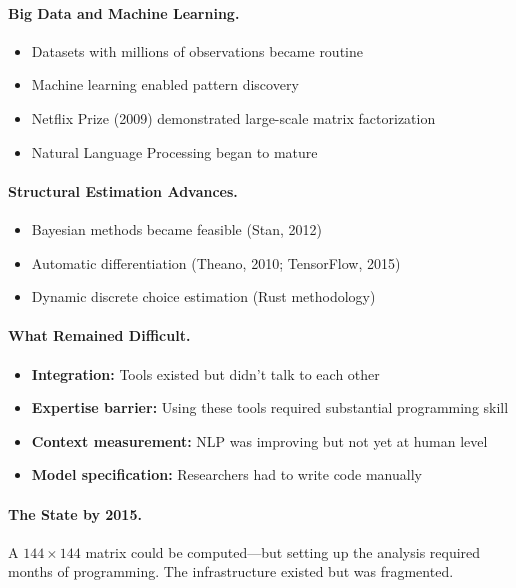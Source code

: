 \documentclass[12pt,a4paper]{article}
\begin{document}
\paragraph{Big Data and Machine Learning.}
\begin{itemize}
  \item Datasets with millions of observations became routine
  \item Machine learning enabled pattern discovery
  \item Netflix Prize (2009) demonstrated large-scale matrix factorization
  \item Natural Language Processing began to mature
\end{itemize}

\paragraph{Structural Estimation Advances.}
\begin{itemize}
  \item Bayesian methods became feasible (Stan, 2012)
  \item Automatic differentiation (Theano, 2010; TensorFlow, 2015)
  \item Dynamic discrete choice estimation (Rust methodology)
\end{itemize}

\paragraph{What Remained Difficult.}
\begin{itemize}
  \item \textbf{Integration:} Tools existed but didn't talk to each other
  \item \textbf{Expertise barrier:} Using these tools required substantial programming skill
  \item \textbf{Context measurement:} NLP was improving but not yet at human level
  \item \textbf{Model specification:} Researchers had to write code manually
\end{itemize}

\paragraph{The State by 2015.}
A $144 \times 144$ matrix could be computed---but setting up the analysis
required months of programming. The infrastructure existed but was fragmented.
\end{document}
